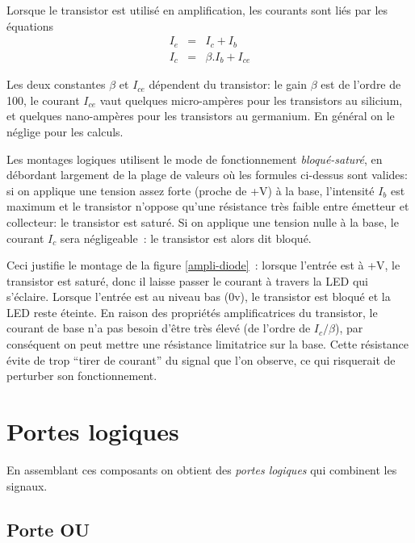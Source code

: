 Lorsque le transistor est utilis\'e en amplification, les courants
sont li\'es par les \'equations 
$$ \begin{array}{rcl}
I_e &=& I_c + I_b \\
I_c &=& \beta . I_b + I_{ce}
\end{array} $$

Les deux constantes $\beta$ et $I_{ce}$ d\'ependent du transistor:
le gain $\beta$ est de l'ordre de 100, le courant $I_{ce}$
vaut quelques micro-amp\`eres pour les transistors au silicium,
et quelques nano-amp\`eres pour les transistors au germanium. En g\'en\'eral
on le n\'eglige pour les calculs.

Les montages logiques utilisent le mode de fonctionnement 
{\em bloqu\'e-satur\'e}, en d\'ebordant largement de la plage de valeurs o\`u les
formules ci-dessus sont valides: si on applique une tension assez forte 
(proche de +V) \`a la base, l'intensit\'e $I_b$ est maximum et le transistor
n'oppose qu'une r\'esistance tr\`es faible entre \'emetteur et collecteur:
le transistor est satur\'e. Si on applique une tension nulle \`a la base,
le courant $I_c$ sera n\'egligeable~: le transistor est alors dit bloqu\'e.

\label{trans-ampli}
Ceci justifie le montage
 de la figure \ref{ampli-diode}~: lorsque l'entr\'ee est \`a +V, le transistor est
satur\'e,  donc il laisse passer le courant \`a travers la LED qui s'\'eclaire. Lorsque 
l'entr\'ee est au niveau bas (0v), le transistor est bloqu\'e et la LED 
reste \'eteinte.  En raison des propri\'et\'es amplificatrices du transistor, 
le courant de base n'a pas besoin d'\^etre tr\`es \'elev\'e
 (de l'ordre de $I_c/\beta$), par cons\'equent on peut mettre une 
r\'esistance limitatrice sur la base. Cette r\'esistance \'evite de trop
``tirer de courant'' du signal que l'on observe, ce qui risquerait
de perturber son fonctionnement.

\section{Portes logiques}

En assemblant ces composants on obtient des {\em portes logiques}
qui combinent les signaux.

\subsection{Porte OU}

